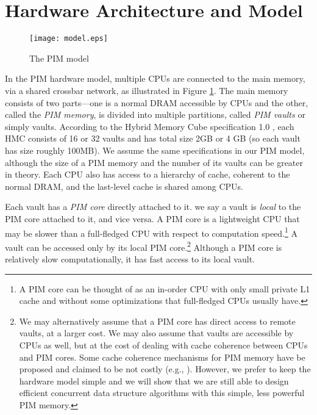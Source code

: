 \section{Hardware Architecture and Model}


\label{section:hardware_model}

\begin{figure}[ht!]
\centering
\texttt{[image: model.eps]}
\caption{The PIM model}
\label{figure:model}
\end{figure}

In the PIM hardware model, multiple CPUs are connected to the main
memory, via a shared crossbar network, as illustrated in Figure \ref{figure:model}.
The main memory consists of two parts---one is a normal DRAM accessible by CPUs 
and the other, called the \textit{PIM memory}, is divided into multiple partitions, 
called \textit{PIM vaults} or simply vaults.  
According to the Hybrid Memory Cube specification 1.0 \cite{website:HMC}, each HMC consists of 16 or 
32 vaults and has total size 2GB or 4 GB (so each vault has size roughly 100MB). 
We assume the same specifications in our PIM model, although the size of a PIM memory and 
the number of its vaults can be greater in theory. 
Each CPU also has access to a hierarchy of cache, coherent to the normal DRAM, 
and the last-level cache is shared among CPUs. 

Each vault has a \textit{PIM core} directly attached to it.
we say a vault is \textit{local} to the PIM core attached to it, and vice versa.
A PIM core is a lightweight CPU that may be slower than a full-fledged CPU
with respect to computation speed.\footnote{
A PIM core can be thought of as an in-order CPU with only small private L1 cache and 
without some optimizations that full-fledged CPUs usually have.}
A vault can be accessed only by its local PIM core.\footnote{
We may alternatively assume that a PIM core has direct access to remote vaults, at a larger cost. 
We may also assume that vaults are accessible by CPUs as well, 
but at the cost of dealing with cache coherence between CPUs and PIM cores. 
Some cache coherence mechanisms for PIM memory have be proposed 
and claimed to be not costly (e.g., \cite{boroumand2016}). 
However, we prefer to keep the hardware model simple and we will show that we are still able to 
design efficient concurrent data structure algorithms with this simple, less powerful PIM memory.}
Although a PIM core is relatively slow computationally, it has fast access to its local vault.

